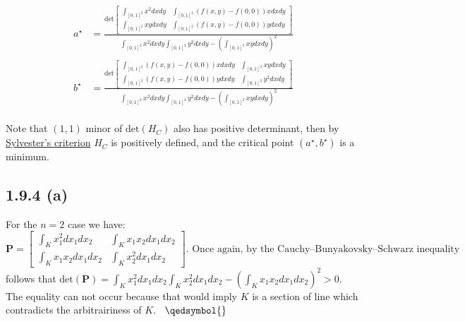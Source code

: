 \documentclass{exam}
\begin{document}
\begin{equation}
    \begin{aligned}
        a^\star&=
        \displaystyle \frac{ 
            \text{det}\begin{bmatrix}
                \displaystyle\int_{[0,1]^2} x^2 d x d y & \displaystyle\int_{[0,1]^2} (f(x,y) - f(0,0)) x d x d y\\[1.2em]
                \displaystyle\int_{[0,1]^2} xy d x d y & \displaystyle\int_{[0,1]^2} (f(x,y) - f(0,0)) y d x d y
            \end{bmatrix}
            }
            {
              \displaystyle\int_{[0,1]^2} x^2 d x d y \displaystyle\int_{[0,1]^2} y^2 d x d y  - (\displaystyle\int_{[0,1]^2} xy d x d y )^2
            }\\
        \\
        b^\star &=
       \displaystyle \frac{ 
           \text{det}\begin{bmatrix}
                \displaystyle\int_{[0,1]^2} (f(x,y) - f(0,0)) x d x d y & \displaystyle\int_{[0,1]^2} xy d x d y \\[1.2em]
                \displaystyle\int_{[0,1]^2} (f(x,y) - f(0,0)) y d x d y & \displaystyle\int_{[0,1]^2} y^2 d x d y
           \end{bmatrix}
           }
           {
             \displaystyle\int_{[0,1]^2} x^2 d x d y \displaystyle\int_{[0,1]^2} y^2 d x d y  - (\displaystyle\int_{[0,1]^2} xy d x d y )^2
           }
    \end{aligned}
\end{equation}\\
Note that $(1,1)$ minor of $\text{det}( H_{C})$ also has positive determinant, then by \href{https://en.wikipedia.org/wiki/Sylvester%27s_criterion}{Sylvester's criterion} $H_{C}$ is positively defined, and the critical point $(a^\star,b^\star)$ is a minimum. 
\\
\subsection*{1.9.4 (a)}
For the $n = 2$ case we have:\\
\begin{equation*}
    \pmb{\text{P}} = \begin{bmatrix}
        \displaystyle\int_{K} x_1^2 d x_1 d x_2 & \displaystyle\int_{K} x_1 x_2 d x_1 d x_2\\[1.2em]
       \displaystyle\int_{K} x_1 x_2 d x_1 d x_2 & \displaystyle\int_{K} x_2^2 d x_1 d x_2 
    \end{bmatrix} \text{. Once again, by the Cauchy–Bunyakovsky–Schwarz inequality}
\end{equation*}
follows that $\text{det}(\pmb{\text{P}}) = \displaystyle\int_{K} x_1^2d x_1 d x_2  \displaystyle\int_{K} x_2^2 d x_1 d x_2  - (\displaystyle\int_{K} x_1 x_2 d x_1 d x_2 )^2 > 0$. The equality can not occur because that would imply $K$ is a section of line which contradicts the arbitrairiness of $K$. \ $\qedsymbol{}$
\end{document}

